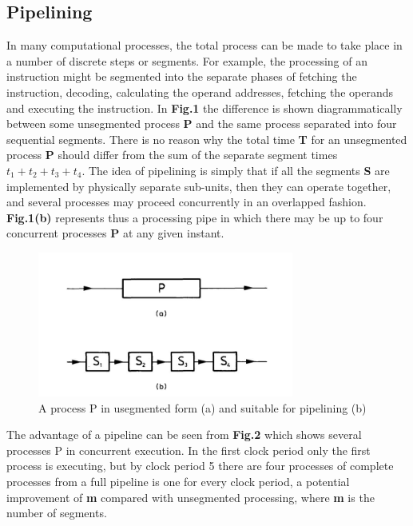 \documentclass[a4paper,12pt]{article}
\begin{document}
\subsection{Pipelining}
   In many computational processes, the total process can be made to
   take place in a number of discrete steps or segments. For example,
   the processing of an instruction might be segmented into the
   separate phases of fetching the instruction, decoding, calculating
   the operand addresses, fetching the operands and executing the
   instruction. In {\bfseries Fig.1} the difference is shown
   diagrammatically between some unsegmented process {\bfseries P} and
   the same process separated into four sequential segments. There is
   no reason why the total time {\bfseries T} for an unsegmented
   process {\bfseries P} should differ from the sum of the separate
   segment times $t_1 + t_2 + t_3 + t_4$. The idea of pipelining
   is simply that if all the segments {\bfseries S} are implemented by
   physically separate sub-units, then they can operate together, and
   several processes may proceed concurrently in an overlapped
   fashion. {\bfseries Fig.1(b)} represents thus a processing pipe in
   which there may be up to four concurrent processes {\bfseries P} at
   any given instant.

\begin{figure}[h]
  \centering
  \includegraphics[width=0.75\textwidth]{./figure_01}
  \caption{A process P in usegmented form (a) and suitable for
    pipelining (b)}
\end{figure}

   The advantage of a pipeline can be seen from \textbf{Fig.2} which
shows several processes P in concurrent execution. In the first
clock period only the first process is executing, but by clock
period 5 there are four processes of complete processes from a full
pipeline is one for every clock period, a potential improvement of
\textbf{m} compared with unsegmented processing, where \textbf{m} is the number of segments.
   
\end{document}
